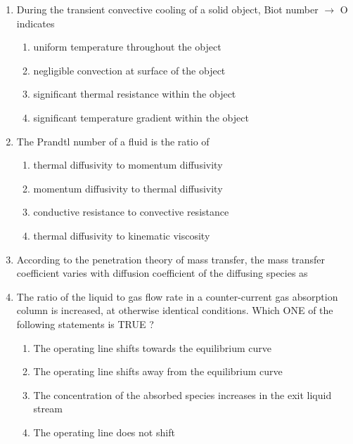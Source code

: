 \documentclass[journal,12pt,onecolumn]{IEEEtran}
\theoremstyle{remark}
\begin{document}
\begin{enumerate}
		\item During the transient convective cooling of a solid object, Biot number $\rightarrow$ O indicates 
		\begin{enumerate}
			\item uniform temperature throughout the object
			\item negligible convection at surface of the object
			\item significant thermal resistance within the object
			\item significant temperature gradient within the object
		\end{enumerate} 
		
		\hfill {}
		
		\item The Prandtl number of a fluid is the ratio of 
		\begin{enumerate}
			\item thermal diffusivity to momentum diffusivity
			\item momentum diffusivity to thermal diffusivity
			\item conductive resistance to convective resistance
			\item thermal diffusivity to kinematic viscosity
		\end{enumerate} 
		
		\hfill {}
		
		\item According to the penetration theory of mass transfer, the mass transfer coefficient  varies with diffusion coefficient  of the diffusing species as 
		\begin{enumerate}
		\end{enumerate} 
		
		\hfill \brak{\text{GATE CH 2009}}
		
		\item The ratio of the liquid to gas flow rate in a counter-current gas absorption column is increased, at otherwise identical conditions. Which ONE of the following statements is TRUE ? 
		\begin{enumerate}
			\item  The operating line shifts towards the equilibrium curve
			\item  The operating line shifts away from the equilibrium curve
			\item  The concentration of the absorbed species increases in the exit liquid stream
			\item The operating line does not shift
		\end{enumerate} 
		

\end{enumerate}
\end{document}
